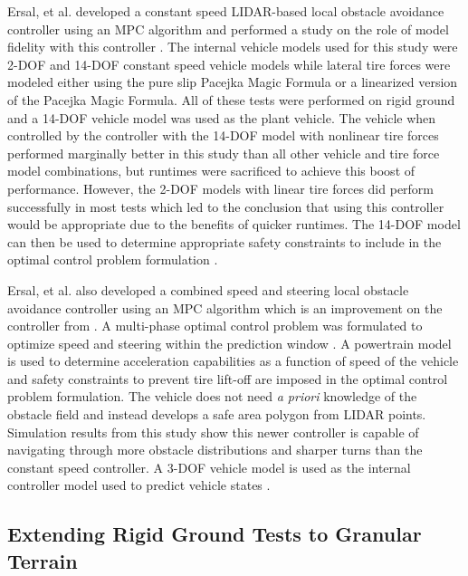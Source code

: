 \documentclass[12pt,onecolumn]{report}
\begin{document}
Ersal, et al. developed a constant speed LIDAR-based local obstacle avoidance controller using an MPC algorithm and performed a study on the role of model fidelity with this controller \cite{ModelFidelity2016}. The internal vehicle models used for this study were 2-DOF and 14-DOF constant speed vehicle models while lateral tire forces were modeled either using the pure slip Pacejka Magic Formula or a linearized version of the Pacejka Magic Formula. All of these tests were performed on rigid ground and a 14-DOF vehicle model was used as the plant vehicle. The vehicle when controlled by the controller with the 14-DOF model with nonlinear tire forces performed marginally better in this study than all other vehicle and tire force model combinations, but runtimes were sacrificed to achieve this boost of performance. However, the 2-DOF models with linear tire forces did perform successfully in most tests which led to the conclusion that using this controller would be appropriate due to the benefits of quicker runtimes. The 14-DOF model can then be used to determine appropriate safety constraints to include in the optimal control problem formulation \cite{ModelFidelity2016}.

Ersal, et al. also developed a combined speed and steering local obstacle avoidance controller using an MPC algorithm which is an improvement on the controller from \cite{ModelFidelity2016}. A multi-phase optimal control problem was formulated to optimize speed and steering within the prediction window \cite{SpeedSteer2015}. A powertrain model is used to determine acceleration capabilities as a function of speed of the vehicle and safety constraints to prevent tire lift-off are imposed in the optimal control problem formulation. The vehicle does not need \textit{a priori} knowledge of the obstacle field and instead develops a safe area polygon from LIDAR points. Simulation results from this study show this newer controller is capable of navigating through more obstacle distributions and sharper turns than the constant speed controller. A 3-DOF vehicle model is used as the internal controller model used to predict vehicle states \cite{SpeedSteer2015}. 

\subsection{Extending Rigid Ground Tests to Granular Terrain}\label{ss:RigidtoGranular}
\end{document}
